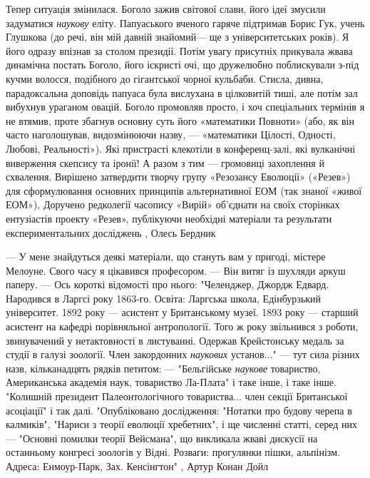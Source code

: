 Тепер ситуація змінилася. Боголо зажив світової слави, його ідеї змусили
задуматися \emph{наукову} еліту. Папуаського вченого гаряче підтримав Борис Гук, учень
Глушкова (до речі, він мій давній знайомий— ще з університетських років). Я
його одразу впізнав за столом президії. Потім увагу присутніх прикувала жвава
динамічна постать Боголо, його іскристі очі, що дружелюбно поблискували з-під
кучми волосся, подібного до гігантської чорної кульбаби.  Стисла, дивна,
парадоксальна доповідь папуаса була вислухана в цілковитій тиші, але потім зал
вибухнув ураганом овацій. Боголо промовляв просто, і хоч спеціальних термінів я
не втямив, проте збагнув основну суть його «математики Повноти» (або, як він
часто наголошував, видозмінюючи назву, — «математики Цілості, Одності, Любові,
Реальності»).  Які пристрасті клекотіли в конференц-залі, які вулканічні
виверження скепсису та іронії! А разом з тим — громовиці захоплення й
схвалення.  Вирішено затвердити творчу групу «Резозансу Еволюції» («Резев») для
сформулювання основних принципів альтернативної ЕОМ (так знаної «живої ЕОМ»),
Доручено редколегії часопису «Вирій» об’єднати на своїх сторінках ентузіастів
проекту «Резев», публікуючи необхідні матеріали та результати експериментальних
досліджень
, Олесь Бердник

— У мене знайдуться деякі матеріали, що стануть вам у пригоді, містере Мелоуне.
Свого часу я цікавився професором. — Він витяг із шухляди аркуш паперу. — Ось
короткі відомості про нього: "Челенджер, Джордж Едвард. Народився в Ларгсі року
1863-го. Освіта: Ларгська школа, Едінбурзький університет. 1892 року — асистент
у Британському музеї. 1893 року — старший асистент на кафедрі порівняльної
антропології. Того ж року звільнився з роботи, звинувачений у нетактовності в
листуванні. Одержав Крейстонську медаль за студії в галузі зоології. Член
закордонних \emph{наукових} установ..." — тут сила різних назв, кільканадцять рядків
петитом: — "Бельгійське \emph{наукове} товариство, Американська академія наук,
товариство Ла-Плата" і таке інше, і таке інше. "Колишній президент
Палеонтологічного товариства... член секції Британської асоціації" і так далі.
"Опубліковано дослідження: "Нотатки про будову черепа в калмиків", "Нариси з
теорії еволюції хребетних", і ще численні статті, серед них — "Основні помилки
теорії Вейсмана", що викликала жваві дискусії на останньому конгресі зоологів у
Відні. Розваги: прогулянки пішки, альпінізм. Адреса: Енмоур-Парк, Зах.
Кенсінгтон"
, Артур Конан Дойл


